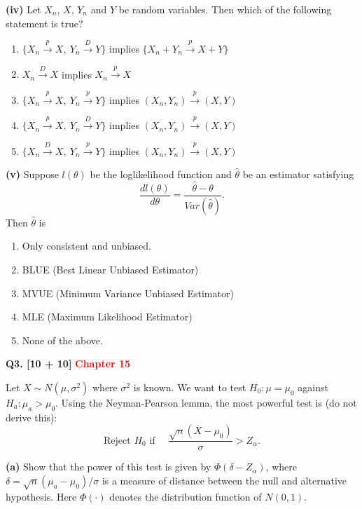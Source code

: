 \documentclass[11pt]{article}
\begin{document}
\textbf{(iv)} Let $X_n$, $X$, $Y_n$ and $Y$ be random variables. Then which of the following statement is true?
\begin{enumerate}
\setlength{\itemsep}{0pt}\setlength{\parsep}{0pt}\setlength{\topsep}{2pt}
\item[A.] $\{X_n\xrightarrow{p}X,\ Y_n\xrightarrow{D}Y\}$ implies $\{X_n+Y_n\xrightarrow{p}X+Y\}$
\item[B.] $X_n\xrightarrow{D}X$ implies $X_n\xrightarrow{p}X$
\item[C.] $\{X_n\xrightarrow{p}X,\ Y_n\xrightarrow{p}Y\}$ implies $(X_n,Y_n)\xrightarrow{p}(X,Y)$
\item[D.] $\{X_n\xrightarrow{p}X,\ Y_n\xrightarrow{D}Y\}$ implies $(X_n,Y_n)\xrightarrow{p}(X,Y)$
\item[E.] $\{X_n\xrightarrow{D}X,\ Y_n\xrightarrow{p}Y\}$ implies $(X_n,Y_n)\xrightarrow{p}(X,Y)$
\end{enumerate}

\textbf{(v)} Suppose $l(\theta)$ be the loglikelihood function and $\hat\theta$ be an estimator satisfying
\[
\frac{dl(\theta)}{d\theta}=\frac{\hat\theta-\theta}{Var(\hat\theta)}.
\]
Then $\hat\theta$ is
\begin{enumerate}
\setlength{\itemsep}{0pt}\setlength{\parsep}{0pt}\setlength{\topsep}{2pt}
\item[A.] Only consistent and unbiased.
\item[B.] BLUE (Best Linear Unbiased Estimator)
\item[C.] MVUE (Minimum Variance Unbiased Estimator)
\item[D.] MLE (Maximum Likelihood Estimator)
\item[E.] None of the above.
\end{enumerate}

\bigskip

\textbf{Q3. [10 + 10]} \textbf{\textcolor{red}{Chapter 15}}

Let $X\sim N(\mu,\sigma^2)$ where $\sigma^2$ is known. We want to test $H_0:\mu=\mu_0$ against $H_a:\mu_a>\mu_0$. Using the Neyman-Pearson lemma, the most powerful test is (do not derive this):
\[
\text{Reject }H_0\text{ if }\quad
\frac{\sqrt n(\overline X-\mu_0)}{\sigma}>Z_\alpha.
\]

\textbf{(a)} Show that the power of this test is given by $\Phi(\delta-Z_\alpha)$, where $\delta=\sqrt n(\mu_a-\mu_0)/\sigma$ is a measure of distance between the null and alternative hypothesis. Here $\Phi(\cdot)$ denotes the distribution function of $N(0,1)$.
\end{document}
